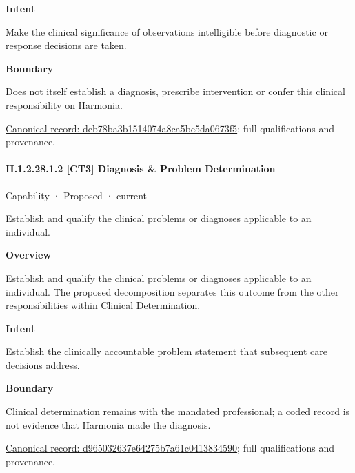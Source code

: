 \textbf{Intent}



Make the clinical significance of observations intelligible before diagnostic or response decisions are taken.



\textbf{Boundary}



Does not itself establish a diagnosis, prescribe intervention or confer this clinical responsibility on Harmonia.


{\footnotesize \href{../../../../continuum/strategy/capability/deb78ba3b1514074a8ca5bc5da0673f5.md}{Canonical record: deb78ba3b1514074a8ca5bc5da0673f5}; full qualifications and provenance.}\par
\paragraph*{II.1.2.28.1.2 [CT3] Diagnosis \& Problem Determination}
\label{navigation:II.1.2.28.1.2}

\label{element:d965032637e64275b7a61c0413834590}
{\small Capability · Proposed · current}\par

Establish and qualify the clinical problems or diagnoses applicable to an individual.



\textbf{Overview}



Establish and qualify the clinical problems or diagnoses applicable to an individual. The proposed decomposition separates this outcome from the other responsibilities within Clinical Determination.



\textbf{Intent}



Establish the clinically accountable problem statement that subsequent care decisions address.



\textbf{Boundary}



Clinical determination remains with the mandated professional; a coded record is not evidence that Harmonia made the diagnosis.


{\footnotesize \href{../../../../continuum/strategy/capability/d965032637e64275b7a61c0413834590.md}{Canonical record: d965032637e64275b7a61c0413834590}; full qualifications and provenance.}\par
